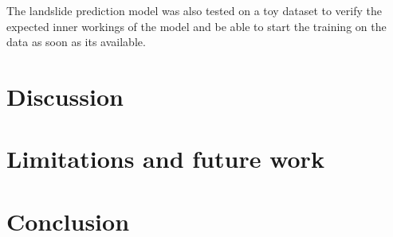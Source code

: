 \documentclass[sigconf, nonacm]{acmart}
\begin{document}
The landslide prediction model was also tested on a toy dataset to verify the expected inner workings of the model and be able to start the training on the data as soon as its available.\\


\section{Discussion}

\section{Limitations and future work}

\section{Conclusion}








\end{document}
